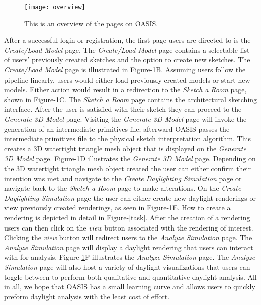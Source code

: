 \begin{figure}[!ht]
\centering
\texttt{[image: overview]}
\caption{This is an overview of the pages on OASIS.}
\label{fig:overview}
\end{figure}

After a successful login or registration, the first page users are directed to is the \textit{Create/Load Model} page.  The \textit{Create/Load Model} page contains a selectable list of users' previously created sketches and the option to create new sketches.  The \textit{Create/Load Model} page is illustrated in Figure-\ref{fig:overview}B.  Assuming users follow the pipeline linearly, users would either load previously created models or start new models.  Either
action would result in a redirection to the \textit{Sketch a Room} page, shown in Figure-\ref{fig:overview}C.  The \textit{Sketch a Room} page contains the architectural sketching interface.  After the user is satisfied with their sketch they can proceed to the \textit{Generate 3D Model} page.  Visiting the \textit{Generate 3D Model} page will invoke the generation of an intermediate primitives file; afterward OASIS passes the intermediate primitives file to the physical sketch
interpretation algorithm. This creates a 3D watertight triangle mesh object that is displayed on the \textit{Generate 3D Model} page.  Figure-\ref{fig:overview}D illustrates the \textit{Generate 3D Model} page.  Depending on the 3D watertight triangle mesh object created the user can either confirm their intention was met and navigate to the \textit{Create Daylighting Simulation} page or navigate back to the \textit{Sketch a Room} page to make alterations.  On the \textit{Create
Daylighting Simulation} page the user can either create new daylight renderings or view previously created renderings, as seen in Figure-\ref{fig:overview}E.  How to create a rendering is depicted in detail in Figure-\ref{task}.  After the creation of a rendering users can then click on the \textit{view} button associated with the rendering of interest.  Clicking the \textit{view} button will redirect users to the \textit{Analyze Simulation} page.  The \textit{Analyze Simulation}
page will display a daylight rendering that users can interact with for analysis.  Figure-\ref{fig:overview}F illustrates the \textit{Analyze Simulation} page.  The \textit{Analyze Simulation} page will also host a variety of daylight visualizations that users can toggle between to perform both qualitative and quantitative daylight analysis.  All in all, we hope that OASIS has a small learning curve and allows users to quickly preform daylight analysis with the least cost of effort.\\

